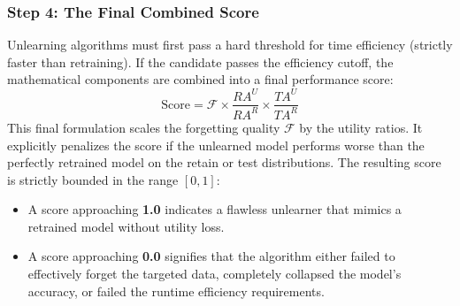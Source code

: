 \documentclass{article}
\begin{document}
\subsubsection*{Step 4: The Final Combined Score}
Unlearning algorithms must first pass a hard threshold for time efficiency (strictly faster than retraining). If the candidate passes the efficiency cutoff, the mathematical components are combined into a final performance score:
\begin{equation}
    \text{Score} = \mathcal{F} \times \frac{RA^U}{RA^R} \times \frac{TA^U}{TA^R}
\end{equation}
This final formulation scales the forgetting quality $\mathcal{F}$ by the utility ratios. It explicitly penalizes the score if the unlearned model performs worse than the perfectly retrained model on the retain or test distributions. The resulting score is strictly bounded in the range $[0, 1]$:
\begin{itemize}
    \item A score approaching \textbf{1.0} indicates a flawless unlearner that mimics a retrained model without utility loss.
    \item A score approaching \textbf{0.0} signifies that the algorithm either failed to effectively forget the targeted data, completely collapsed the model's accuracy, or failed the runtime efficiency requirements.
\end{itemize}
\end{document}
